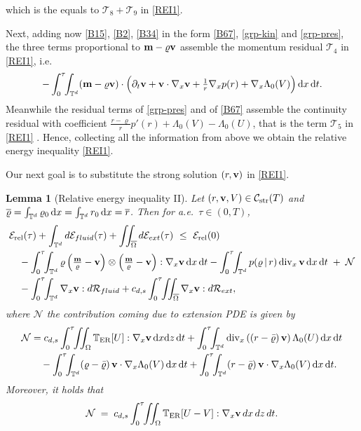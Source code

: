 \documentclass[12pt,a4paper,twoside]{article}
\newcommand{\Ov}[1]{\overline{#1}}
\newcommand{\vr}{\varrho}
\newcommand{\vv}{\vc{v}}
\newcommand{\vc}[1]{{\bf #1}}
\newcommand{\dx}{{\,\rm d} {x}}
\newcommand{\dt}{{\,\rm d} t }
\newcommand{\lr}[1]{\left( #1 \right)}
\newcommand{\Erel}{\mathcal{E}_{\mathrm{rel}}}
\newtheorem{lemma}[thm]{Lemma}
\numberwithin{equation}{section}%
\newcommand{\T}{\mathbb{T}}
\newcommand{\vm}{\vc{m}}
\newcommand{\dz}{{\rm d} z}
\newcommand{\Gradx}{\nabla_x}
\newcommand{\Divx}{\operatorname{div}_x}
\newcommand{\Lambdaz}{\Lambda_0}
\begin{document}
\begin{pf}
	 which is the equals to $\mathcal{T}_8+\mathcal{T}_9$ in \eqref{REI1}. \par 
	 Next, adding now \eqref{B15}, \eqref{B2}, \eqref{B34} in the form \eqref{B67}, \eqref{grp-kin} and \eqref{grp-pres}, the three terms proportional to $\vm-\vr\vv$ assemble the momentum residual $\mathcal{T}_4$ in \eqref{REI1}, i.e. 
	 \[
	 -\int_0^\tau\!\!\int_{\mathbb T^d}(\vm-\vr\vv)\cdot\Big(\partial_t\vv+\vv\cdot\Gradx\vv+\tfrac1r\Gradx p(r)+\Gradx\Lambdaz(V)\Big)\dx\dt .
	 \]
	 Meanwhile the residual terms of \eqref{grp-pres} and of \eqref{B67} assemble the continuity residual with coefficient $\tfrac{r-\vr}{r}p'(r)+\Lambdaz(V)-\Lambdaz(U)$, that is the term $\mathcal{T}_5$ in \eqref{REI1} . Hence, collecting all the information from above we obtain the relative energy inequality \eqref{REI1}.


	\end{pf}
	
	
	\medskip
	


	Our next goal is to substitute the strong solution $(r,\vv)$ in \eqref{REI1}.
\begin{lemma}[Relative energy inequality II]\label{lem:reduced}
	Let $(r,\vv,V)\in\mathcal C_{\mathrm{str}}(T)$ and $\Ov{\vr}=\int_{\T^d} \vr_0 \dx = \int_{\T^d} r_0 \dx=\Ov{r}$. Then for a.e.\ $\tau\in(0,T)$,
	\begin{equation}\label{REI2}
		\begin{aligned}
			&\Erel(\tau)+\int_{\mathbb T^d}d\mathcal E_{fluid}(\tau)+\iint_{\overline\Omega}d\mathcal E_{ext}(\tau)
			\ \le\ \Erel(0)\\
			&\quad-\int_0^\tau\!\!\int_{\mathbb T^d}\vr \lr{\tfrac{\vm}{\vr}-\vv} \otimes \lr{\tfrac{\vm}{\vr}-\vv}:\Gradx\vv \dx \dt
			-\int_0^\tau\!\!\int_{\mathbb T^d}p(\vr\,|\,r)\Divx\vv \dx \dt
			\;+\;\mathcal N\\
			&\quad-\int_0^\tau\!\!\int_{\mathbb T^d}\Gradx\vv:d\mathcal R_{fluid}
			+c_{d,s}\int_0^\tau\!\!\iint_{\overline\Omega}\Gradx\vv:d\mathcal R_{ext},
		\end{aligned}
	\end{equation}
	where $\mathcal{N}$ the contribution coming due to extension PDE is given by
	\begin{equation}\label{N}
		\begin{aligned}
			\mathcal{N}
			&=c_{d,s}\int_0^\tau\!\!\iint_\Omega\T_{\rm ER}[U]:\Gradx\vv \dx \dz \dt
			+ \int_0^\tau\!\!\int_{\mathbb T^d}\Divx\lr{(r-\bar\vr)\,\vv}\Lambdaz(U) \dx \dt  \\
			&\quad
			-\int_0^\tau\!\!\int_{\mathbb T^d}(\vr-\bar\vr)\,\vv\cdot\Gradx\Lambdaz(V) \dx \dt  +\int_0^\tau\!\!\int_{\mathbb T^d}(r-\bar\vr)\,\vv\cdot\Gradx\Lambdaz(V) \dx \dt.
		\end{aligned}
	\end{equation}
	Moreover, it holds that 
	\begin{align}\label{N-final}
		\mathcal N \;=\; c_{d,s}\int_0^\tau\!\!\iint_\Omega \T_{\rm ER}[U-V] : \Gradx\vv \,dx\,dz\,dt .
	\end{align}
\end{lemma}
\end{document}
